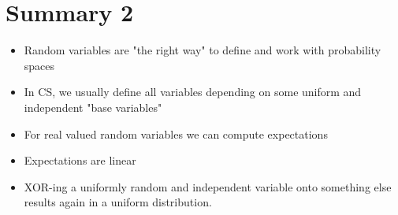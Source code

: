 	\section{Summary 2}
		\begin{itemize}
			\item Random variables are "the right way" to define and work with probability spaces
			\item In CS, we usually define all variables depending on some uniform and independent "base variables"
			\item For real valued random variables we can compute expectations
			\item Expectations are linear
			\item XOR-ing a uniformly random and independent variable onto something else results again in a uniform distribution.
		\end{itemize}
















































